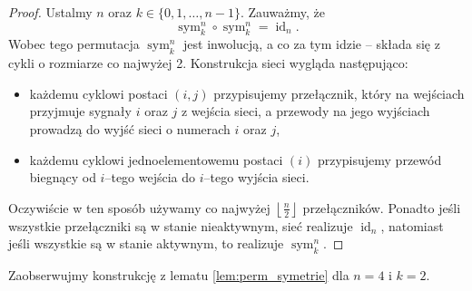 \documentclass[a4paper]{article}
\newcommand{\sym}[2]{\operatorname{sym}_{#2}^{#1}}
\newcommand{\id}[1]{\operatorname{id}_{#1}}
\newcommand{\td}{\text{.}}
\newcommand{\floor}[1]{\left\lfloor #1 \right\rfloor}
\theoremstyle{definition}
\begin{document}
\begin{proof}
    Ustalmy \(n\) oraz \(k \in \{0, 1, \ldots, n-1\}\). Zauważmy, że 
    \[
    \sym{n}{k} \circ \sym{n}{k} = \id{n} \td
    \]
    Wobec tego permutacja \(\sym n k\) jest inwolucją, a co za tym idzie -- składa się z cykli o rozmiarze co najwyżej 2. Konstrukcja sieci wygląda następująco:
    \begin{itemize}
        \item każdemu cyklowi postaci \((i,j)\) przypisujemy przełącznik, który na wejściach przyjmuje sygnały \(i\) oraz \(j\) z wejścia sieci, a przewody na jego wyjściach prowadzą do wyjść sieci o numerach \(i\) oraz \(j\),
        \item każdemu cyklowi jednoelementowemu postaci \((i)\) przypisujemy przewód biegnący od \(i\)--tego wejścia do \(i\)--tego wyjścia sieci.
    \end{itemize}
    Oczywiście w ten sposób używamy co najwyżej \(\floor{\frac{n}{2}}\) przełączników. 
    Ponadto jeśli wszystkie przełączniki są w stanie nieaktywnym, sieć realizuje \(\id n\), natomiast jeśli wszystkie są w stanie aktywnym, to realizuje \(\sym n k\).
\end{proof}

Zaobserwujmy konstrukcję z lematu \ref{lem:perm_symetrie} dla \(n=4\) i \(k=2\).
\end{document}
